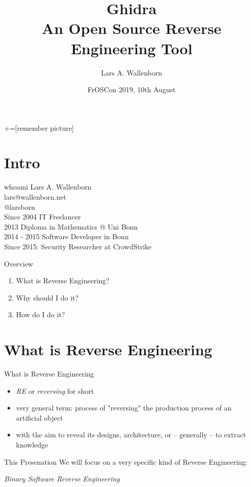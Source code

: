 \documentclass{beamer}
\title{Ghidra\\An Open Source Reverse Engineering Tool}
\date{FrOSCon 2019, 10th August}
\author{Lars A. Wallenborn}
\institute{How the NSA open-sourced all software in 2019}
\begin{document}
+=[remember picture]

  \maketitle
  \section{Intro}
  \begin{frame}{whoami}
    Lars A. Wallenborn\\
    lars@wallenborn.net\\
    @larsborn\\
    \pause
    \vspace{1cm}
    Since 2004 IT Freelancer\\
    2013 Diploma in Mathematics @ Uni Bonn\\
    2014 - 2015 Software Developer in Bonn\\
    Since 2015: Security Researcher at CrowdStrike
  \end{frame}

  \begin{frame}{Overview}
    \begin{enumerate}
      \item What is Reverse Engineering?
      \item Why should I do it?
      \item How do I do it?
    \end{enumerate}
  \end{frame}

  \section{What is Reverse Engineering}
  \begin{frame}{What is Reverse Engineering}
    \begin{itemize}
      \item \emph{RE} or \emph{reversing} for short\pause
      \item very general term: \pause process of "reversing" the production process of an artificial object\pause
      \item with the aim to reveal its designs, architecture, or -- generally -- to extract knowledge
    \end{itemize}
    \pause
    \begin{alertblock}{This Presenation}\pause
      We will focus on a very specific kind of Reverse Engineering:\\
      \begin{center}
        \emph{Binary Software Reverse Engineering}
      \end{center}
    \end{alertblock}
  \end{frame}
\end{document}
